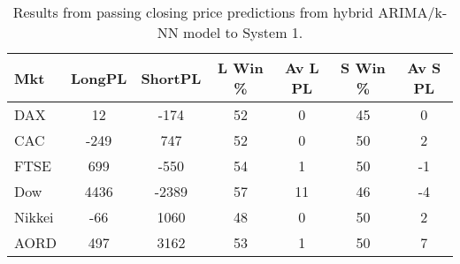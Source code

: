 \begin{table}[ht]
\centering
\caption[Results from passing closing price predictions from hybrid ARIMA/k-NN model to System 1]{Results from passing closing price predictions from hybrid ARIMA/k-NN model to System 1.} 
\label{tab:chp_ts:pred_close_arima_knn_sys1}
\begin{tabular}{lcccccc}
  \toprule Mkt & LongPL & ShortPL & L Win \% & Av L PL & S Win \% & Av S PL \\ 
  \midrule DAX & 12 & -174 & 52 & 0 & 45 & 0 \\ 
  CAC & -249 & 747 & 52 & 0 & 50 & 2 \\ 
  FTSE & 699 & -550 & 54 & 1 & 50 & -1 \\ 
  Dow & 4436 & -2389 & 57 & 11 & 46 & -4 \\ 
  Nikkei & -66 & 1060 & 48 & 0 & 50 & 2 \\ 
  AORD & 497 & 3162 & 53 & 1 & 50 & 7 \\ 
   \bottomrule \end{tabular}
\end{table}
